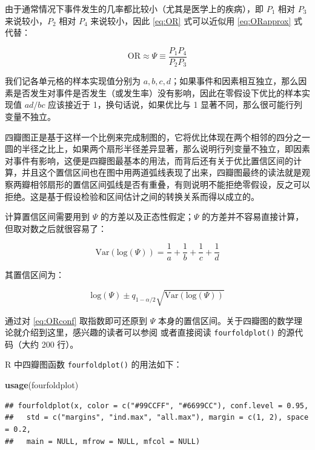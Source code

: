 \documentclass[
  b5paper,
  UTF8,twoside]{book}
\newenvironment{Shaded}{\begin{snugshade}}{\end{snugshade}}
\newcommand{\FunctionTok}[1]{\textcolor[rgb]{0.13,0.29,0.53}{\textbf{#1}}}
\newcommand{\NormalTok}[1]{#1}
\begin{document}
由于通常情况下事件发生的几率都比较小（尤其是医学上的疾病），即 \(P_{1}\) 相对 \(P_{3}\) 来说较小，\(P_{2}\) 相对 \(P_{4}\) 来说较小，因此 \eqref{eq:OR} 式可以近似用 \eqref{eq:ORapprox} 式代替：

\begin{equation} 
\mathrm{OR}\approx\Psi\equiv\frac{P_{1}P_{4}}{P_{2}P_{3}}
\label{eq:ORapprox}
\end{equation}

我们记各单元格的样本实现值分别为 \(a,b,c,d\)；如果事件和因素相互独立，那么因素是否发生对事件是否发生（或发生率）没有影响，因此在零假设下优比的样本实现值 \(ad/bc\) 应该接近于 1，换句话说，如果优比与 1 显著不同，那么很可能行列变量不独立。

四瓣图正是基于这样一个比例来完成制图的，它将优比体现在两个相邻的四分之一圆的半径之比上，如果两个扇形半径差异显著，那么说明行列变量不独立，即因素对事件有影响，这便是四瓣图最基本的用法，而背后还有关于优比置信区间的计算，并且这个置信区间也在图中用两道弧线表现了出来，四瓣图最终的读法就是观察两瓣相邻扇形的置信区间弧线是否有重叠，有则说明不能拒绝零假设，反之可以拒绝。这是基于假设检验和区间估计之间的转换关系而得以成立的。

计算置信区间需要用到 \(\Psi\) 的方差以及正态性假定；\(\Psi\) 的方差并不容易直接计算，但取对数之后就很容易了：

\begin{equation}
\mathrm{Var}(\mathrm{log}(\Psi))=\frac{1}{a}+\frac{1}{b}+\frac{1}{c}+\frac{1}{d}
\label{eq:ORlog}
\end{equation}

其置信区间为：

\begin{equation}
\mathrm{log}(\Psi)\pm q_{1-\alpha/2}\sqrt{\mathrm{Var}(\mathrm{log}(\Psi))}
\label{eq:ORconf}
\end{equation}

通过对 \eqref{eq:ORconf} 取指数即可还原到 \(\Psi\) 本身的置信区间。关于四瓣图的数学理论就介绍到这里，感兴趣的读者可以参阅 \citet{Friendly94} 或者直接阅读 \texttt{fourfoldplot()} 的源代码（大约 200 行）。

R 中四瓣图函数 \texttt{fourfoldplot()} 的用法如下：

\begin{Shaded}
\begin{Highlighting}[]
\FunctionTok{usage}\NormalTok{(fourfoldplot)}
\end{Highlighting}
\end{Shaded}

\begin{verbatim}
## fourfoldplot(x, color = c("#99CCFF", "#6699CC"), conf.level = 0.95,
##   std = c("margins", "ind.max", "all.max"), margin = c(1, 2), space = 0.2,
##   main = NULL, mfrow = NULL, mfcol = NULL)
\end{verbatim}
\end{document}
